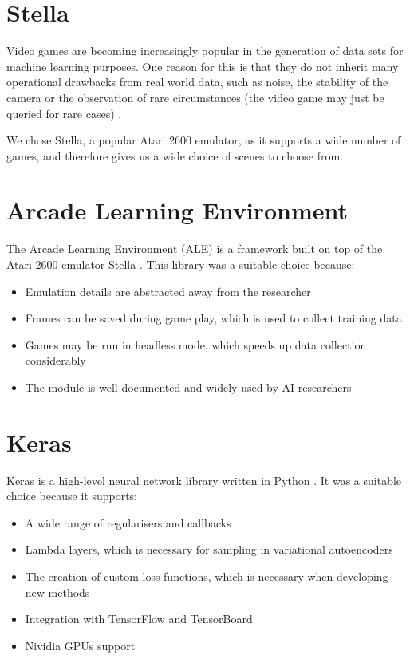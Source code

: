%
%
%
%
%
\section{Stella}
Video games are becoming increasingly popular in the generation of data sets for machine learning purposes. One reason for this is that they do not inherit many operational drawbacks from real world data, such as noise, the stability of the camera or the observation of rare circumstances (the video game may just be queried for rare cases) \cite{Zsolnai-Feher2016, Richter2016}. 

We chose Stella, a popular Atari 2600 emulator, as it supports a wide number of games, and therefore gives us a wide choice of scenes to choose from.

%
%
%
%
%
\section{Arcade Learning Environment}
The Arcade Learning Environment (ALE) is a framework built on top of the Atari
2600 emulator Stella \cite{Bellemare2015}. This library was a suitable choice because:
\begin{itemize}
\item Emulation details are abstracted away from the researcher
\item Frames can be saved during game play, which is used to collect training data
\item Games may be run in headless mode, which speeds up data collection considerably
\item The module is well documented and widely used by AI researchers
\end{itemize}


%
%
%
%
%
\section{Keras}
Keras is a high-level neural network library written in Python \cite{Chollet2016}. It was a suitable choice because it supports:
\begin{itemize}
\item A wide range of regularisers and callbacks 
\item Lambda layers, which is necessary for sampling in variational autoencoders
\item The creation of custom loss functions, which is necessary when developing new methods
\item Integration with TensorFlow and TensorBoard
\item Nividia GPUs support
\end{itemize}